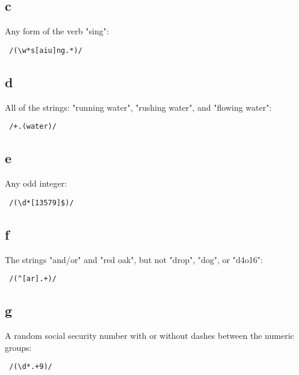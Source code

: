 \documentclass{article}
\begin{document}
\subsection{c}
Any form of the verb "sing": \begin{verbatim} /(\w*s[aiu]ng.*)/ \end{verbatim}

\subsection{d}
All of the strings: "running water", "rushing water", and "flowing water": \begin{verbatim} /+.(water)/ \end{verbatim}

\subsection{e}
Any odd integer: \begin{verbatim} /(\d*[13579]$)/ \end{verbatim}

\subsection{f}
The strings "and/or" and "red oak", but not "drop", "dog", or "d4o16": \begin{verbatim} /(^[ar].+)/ \end{verbatim}

\subsection{g}
A random social security number with or without dashes between the numeric groups: \begin{verbatim} /(\d*.+9)/ \end{verbatim}
\end{document}
